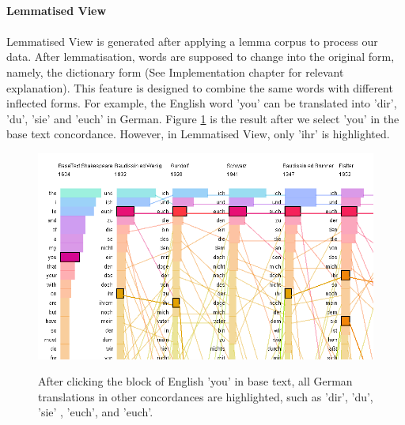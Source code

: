 \paragraph{Lemmatised View}
\paragraph[]{}Lemmatised View is generated after applying a lemma corpus to process our data. After lemmatisation, words are supposed to change into the original form, namely, the dictionary form (See Implementation chapter for relevant explanation). This feature is designed to combine the same words with different inflected forms. For example, the English word 'you' can be translated into 'dir', 'du', 'sie' and 'euch' in German. Figure \ref{fig:youInFreq} is the result after we select 'you' in the base text concordance. However, in Lemmatised View, only 'ihr' is highlighted.
 
\begin{figure}[H]
	\centering	
	\includegraphics[scale=0.5]{Figs/You-In-Frequency}\\[1ex]
	\caption{ After clicking the block of English 'you' in base text, all German translations in other concordances are highlighted, such as  'dir', 'du', 'sie' , 'euch', and 'euch'.} 
	\label{fig:youInFreq}
\end{figure} 


